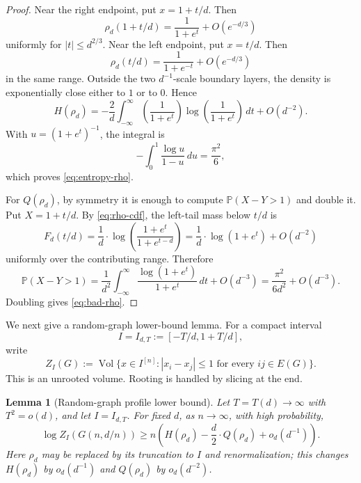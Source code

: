 \documentclass[11pt]{article}
\newtheorem{lemma}[theorem]{Lemma}
\theoremstyle{definition}
\DeclareMathOperator{\Vol}{Vol}
\newcommand{\PP}{\mathbb{P}}
\begin{document}
\begin{proof}
Near the right endpoint, put $x=1+t/d$.  Then
\[
  \rho_d(1+t/d)=\frac{1}{1+e^t}+O(e^{-d/3})
\]
uniformly for $|t|\le d^{2/3}$.  Near the left endpoint, put $x=t/d$.  Then
\[
  \rho_d(t/d)=\frac{1}{1+e^{-t}}+O(e^{-d/3})
\]
in the same range.  Outside the two $d^{-1}$-scale boundary layers, the density is exponentially close either to $1$ or to $0$.  Hence
\[
  H(\rho_d)=-\frac2d\int_{-\infty}^{\infty}
  \left(\frac{1}{1+e^t}\right)\log\left(\frac{1}{1+e^t}\right)\,dt+O(d^{-2}).
\]
With $u=(1+e^t)^{-1}$, the integral is
\[
  -\int_0^1\frac{\log u}{1-u}\,du=\frac{\pi^2}{6},
\]
which proves \eqref{eq:entropy-rho}.

\bigskip
\noindent
For $Q(\rho_d)$, by symmetry it is enough to compute $\PP(X-Y>1)$ and double it.  Put $X=1+t/d$.  By \eqref{eq:rho-cdf}, the left-tail mass below $t/d$ is
\[
  F_d(t/d)=\frac1d\cdot\log\left(\frac{1+e^t}{1+e^{t-d}}\right)
  =\frac1d\cdot\log(1+e^t)+O(d^{-2})
\]
uniformly over the contributing range.  Therefore
\[
  \PP(X-Y>1)
  =\frac1{d^2}\int_{-\infty}^{\infty}
  \frac{\log(1+e^t)}{1+e^t}\,dt+O(d^{-3})
  =\frac{\pi^2}{6d^2}+O(d^{-3}).
\]
Doubling gives \eqref{eq:bad-rho}.
\end{proof}


\smallskip
\noindent
We next give a random-graph lower-bound lemma.  For a compact interval
\[
  I=I_{d,T}:=[-T/d,1+T/d],
\]
write
\[
  Z_I(G):=\Vol\{x\in I^{[n]}: |x_i-x_j|\le1\text{ for every }ij\in E(G)\}.
\]
This is an unrooted volume.  Rooting is handled by slicing at the end.

\begin{lemma}[Random-graph profile lower bound]\label{lem:random-profile-lower}
Let $T=T(d)\to\infty$ with $T^2=o(d)$, and let $I=I_{d,T}$.  For fixed $d$, as $n\to\infty$, with high probability,
\[
  \log Z_I(G(n,d/n))
  \ge
  n\left(H(\rho_d)-\frac d2 \cdot Q(\rho_d)+o_d(d^{-1})\right).
\]
Here $\rho_d$ may be replaced by its truncation to $I$ and renormalization; this changes $H(\rho_d)$ by $o_d(d^{-1})$ and $Q(\rho_d)$ by $o_d(d^{-2})$.
\end{lemma}
\end{document}
